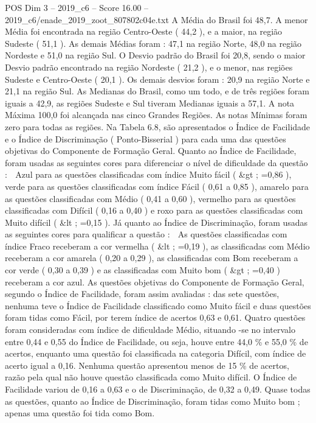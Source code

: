\begin{textsample}{POS Dim 3 – 2019\_c6 – Score 16.00 – 2019\_c6/enade\_2019\_zoot\_807802c04e.txt}
A Média do Brasil foi 48,7.
A menor Média foi encontrada na região Centro-Oeste ( 44,2 ), e a maior, na região Sudeste ( 51,1 ).
As demais Médias foram : 47,1 na região Norte, 48,0 na região Nordeste e 51,0 na região Sul.
O Desvio padrão do Brasil foi 20,8, sendo o maior Desvio padrão encontrado na região Nordeste ( 21,2 ), e o menor, nas regiões Sudeste e Centro-Oeste ( 20,1 ).
Os demais desvios foram : 20,9 na região Norte e 21,1 na região Sul.
As Medianas do Brasil, como um todo, e de três regiões foram iguais a 42,9, as regiões Sudeste e Sul tiveram Medianas iguais a 57,1.
A nota Máxima 100,0 foi alcançada nas cinco Grandes Regiões.
As notas Mínimas foram zero para todas as regiões.
Na Tabela 6.8, são apresentados o Índice de Facilidade e o Índice de Discriminação ( Ponto-Bisserial ) para cada uma das questões objetivas do Componente de Formação Geral.
Quanto ao Índice de Facilidade, foram usadas as seguintes cores para diferenciar o nível de dificuldade da questão :  Azul para as questões classificadas com índice Muito fácil ( \&gt ; =0,86 ), verde para as questões classificadas com índice Fácil ( 0,61 a 0,85 ), amarelo para as questões classificadas com Médio ( 0,41 a 0,60 ), vermelho para as questões classificadas com Difícil ( 0,16 a 0,40 ) e roxo para as questões classificadas com Muito difícil ( \&lt ; =0,15 ).
Já quanto ao Índice de Discriminação, foram usadas as seguintes cores para qualificar a questão :  As questões classificadas com índice Fraco receberam a cor vermelha ( \&lt ; =0,19 ), as classificadas com Médio receberam a cor amarela ( 0,20 a 0,29 ), as classificadas com Bom receberam a cor verde ( 0,30 a 0,39 ) e as classificadas com Muito bom ( \&gt ; =0,40 ) receberam a cor azul.
As questões objetivas do Componente de Formação Geral, segundo o Índice de Facilidade, foram assim avaliadas : das sete questões, nenhuma teve o Índice de Facilidade classificado como Muito fácil e duas questões foram tidas como Fácil, por terem índice de acertos 0,63 e 0,61.
Quatro questões foram consideradas com índice de dificuldade Médio, situando -se no intervalo entre 0,44 e 0,55 do Índice de Facilidade, ou seja, houve entre 44,0 \% e 55,0 \% de acertos, enquanto uma questão foi classificada na categoria Difícil, com índice de acerto igual a 0,16.
Nenhuma questão apresentou menos de 15 \% de acertos, razão pela qual não houve questão classificada como Muito difícil.
O Índice de Facilidade variou de 0,16 a 0,63 e o de Discriminação, de 0,32 a 0,49.
Quase todas as questões, quanto ao Índice de Discriminação, foram tidas como Muito bom ; apenas uma questão foi tida como Bom.

\end{textsample}
